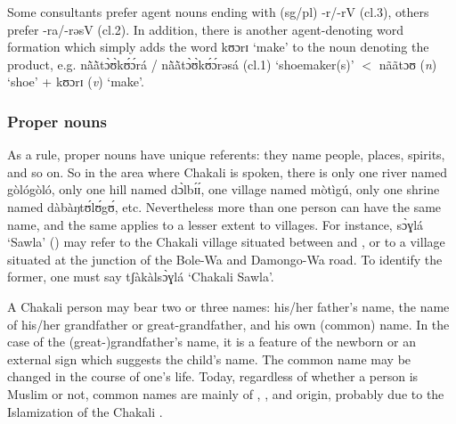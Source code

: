 \begin{exe}
\begin{exe}
\begin{exe}
\begin{exe}
\begin{exe}
\begin{exe}
\begin{exe}
Some consultants prefer agent nouns ending with ({\sc sg}/{\sc pl})  {\sls -r/-rV} ({\sc cl.3}),  others prefer  {\sls -ra/-rəsV} ({\sc cl.2}).  In addition, there is another agent-denoting word formation which simply adds the word {\sls kʊɔrɪ} `make' to the noun denoting the product, e.g. {\sls nã̀ã̀tɔ̀ʊ̀kʊ́ɔ́rá} / {\sls nã̀ã̀tɔ̀ʊ̀kʊ́ɔ́rəsá} ({\sc cl.1}) `shoemaker(s)' $<$ {\sls nããtɔʊ} ({\it n}) `shoe' + {\sls kʊɔrɪ} ({\it v}) `make'.


\subsubsection{Proper nouns}
\label{sec:GRM-prop-noun}

% 

As a rule,   proper nouns have  unique referents:  they  name people, places, spirits, and so on.  So in the area where Chakali is spoken, there is only one river named {\sls gòlógòló}, only one hill named {\sls dɔ̀lbɪ́ɪ́}, one village named {\sls mòtìgú},  only one shrine named {\sls dàbàŋtʊ́lʊ́gʊ́}, etc.  Nevertheless more than one person can have the same name, and the same applies to a lesser extent to villages. For instance, {\sls sɔ̀ɣlá} `Sawla' () may refer to the Chakali village situated between  and , or to a  village situated at the junction of the Bole-Wa and Damongo-Wa road. To identify the former, one must say {\sls tʃàkàlsɔ̀ɣlá} `Chakali Sawla'. 

A  Chakali person may bear two or three names: his/her father's name, the name of his/her grandfather or great-grandfather, and his own (common) name. In the case of the (great-)grandfather's name, it is a feature of the newborn or an external sign which suggests the child's name.  The common name may be changed in the course of one's life. Today, regardless of whether a  person is Muslim or not, common names are mainly of , , and  origin, probably due to the Islamization of the Chakali  \citep{brin15c}.



\end{exe}
\end{exe}
\end{exe}
\end{exe}
\end{exe}
\end{exe}
\end{exe}
